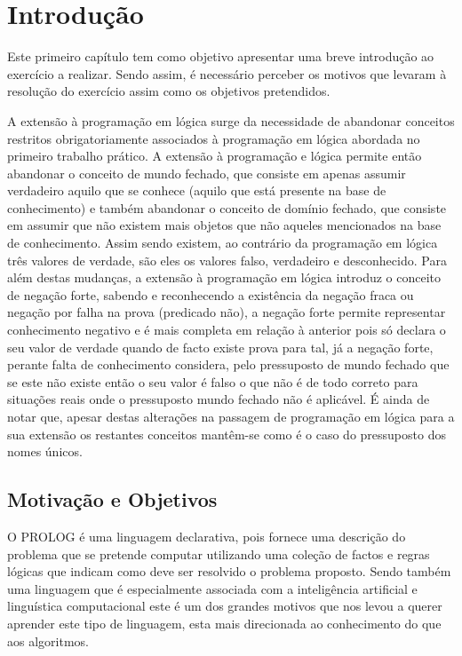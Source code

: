 \chapter{Introdução}
\label{cap:p1}
Este primeiro capítulo tem como objetivo apresentar uma breve introdução ao exercício a realizar. Sendo assim, é necessário perceber os motivos que levaram à resolução do exercício assim como os objetivos pretendidos.

A extensão à programação em lógica surge da necessidade de abandonar conceitos restritos obrigatoriamente associados à programação em lógica abordada no primeiro trabalho prático.
A extensão à programação e lógica permite então abandonar o conceito de mundo fechado, que consiste em apenas assumir verdadeiro aquilo que se conhece (aquilo que está presente na base de conhecimento) e também abandonar o conceito de domínio fechado, que consiste em assumir que não existem mais objetos que não aqueles mencionados na base de conhecimento. Assim sendo existem, ao contrário da programação em lógica três valores de verdade, são eles os valores falso, verdadeiro e desconhecido.
Para além destas mudanças, a extensão à programação em lógica introduz o conceito de negação forte, sabendo e reconhecendo a existência da negação fraca ou negação por falha na prova (predicado não), a negação forte permite representar conhecimento negativo e é mais completa em relação à anterior pois só declara o seu valor de verdade quando de facto existe prova para tal, já a negação forte, perante falta de conhecimento considera, pelo pressuposto de mundo fechado que se este não existe então o seu valor é falso o que não é de todo correto para situações reais onde o pressuposto mundo fechado não é aplicável.
É ainda de notar que, apesar destas alterações na passagem de programação em lógica para a sua extensão os restantes conceitos mantêm-se como é o caso do pressuposto dos nomes únicos.



\section{Motivação e Objetivos}
\label{p1:MotivObj}
O PROLOG é uma linguagem declarativa, pois fornece uma descrição do problema que se pretende computar utilizando uma coleção de factos e regras lógicas que indicam como deve ser resolvido o problema proposto. Sendo também uma linguagem que é especialmente associada com a inteligência artificial e linguística computacional este é um dos grandes motivos que nos levou a querer aprender este tipo de linguagem, esta mais direcionada ao conhecimento do que aos algoritmos. 


